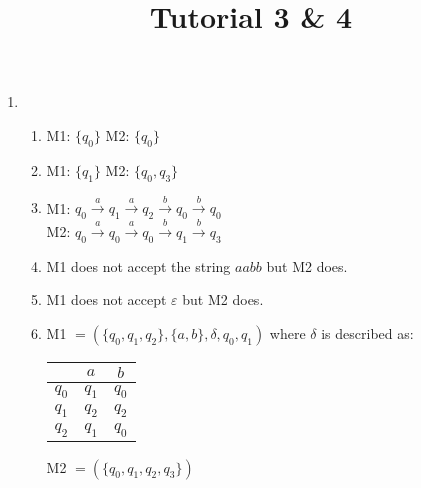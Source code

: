 \documentclass[a4paper, 12pt]{article}
\title{Tutorial 3 & 4}
\date{}
\author{}
\begin{document}
    \begin{enumerate}
        \item
        \begin{enumerate}
            \item M1: \( \{q_0\}\) M2: \(\{q_0\}\)
            \item M1: \(\{q_1\}\) M2: \( \{q_0, q_3\} \)
            \item M1: \(q_0 \overset{a}{\to} q_1 \overset{a}{\to} q_2 \overset{b}{\to} q_0 \overset{b}{\to} q_0\) \\
            M2: \(q_0 \overset{a}{\to} q_0 \overset{a}{\to} q_0 \overset{b}{\to} q_1 \overset{b}{\to} q_3\)
            \item M1 does not accept the string \(aabb\) but M2 does.
            \item M1 does not accept \(\varepsilon\) but M2 does.
            \item M1 \(= (\{q_0, q_1, q_2\}, \{a, b\}, \delta, q_0, q_1)\) where \(\delta\) is described as: \\ 
            \begin{center}
                
            \begin{tabular}{c|cc}
                 & $a$ & $b$ \\ \hline
            $q_0$ & $q_1$ & $q_0$ \\ 
            $q_1$ & $q_2$ & $q_2$ \\ 
            $q_2$ & $q_1$ & $q_0$
            \end{tabular}

            \end{center}
            \vspace{5mm}

            M2 \(= (\{q_0, q_1, q_2, q_3\})\)
        \end{enumerate}
    \end{enumerate}
\end{document}
